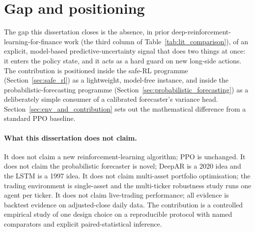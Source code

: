 \section{Gap and positioning}
\label{sec:gap_and_positioning}

The gap this dissertation closes is the absence, in prior deep-reinforcement-learning-for-finance work (the third column of Table~\ref{tab:lit_comparison}), of an explicit, model-based predictive-uncertainty signal that does two things at once: it enters the policy state, and it acts as a hard guard on new long-side actions. The contribution is positioned inside the safe-RL programme (Section~\ref{sec:safe_rl}) as a lightweight, model-free instance, and inside the probabilistic-forecasting programme (Section~\ref{sec:probabilistic_forecasting}) as a deliberately simple consumer of a calibrated forecaster's variance head. Section~\ref{sec:env_and_contribution} sets out the mathematical difference from a standard PPO baseline.

\paragraph{What this dissertation does not claim.} It does not claim a new reinforcement-learning algorithm; PPO is unchanged. It does not claim the probabilistic forecaster is novel; DeepAR is a 2020 idea and the LSTM is a 1997 idea. It does not claim multi-asset portfolio optimisation; the trading environment is single-asset and the multi-ticker robustness study runs one agent per ticker. It does not claim live-trading performance; all evidence is backtest evidence on adjusted-close daily data. The contribution is a controlled empirical study of one design choice on a reproducible protocol with named comparators and explicit paired-statistical inference.
